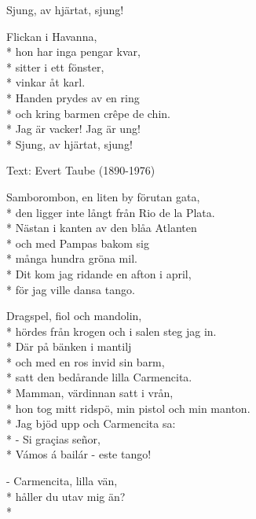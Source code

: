 \begin{SongText}
\begin{SongVerse}
Sjung, av hjärtat, sjung!
\end{SongVerse}
\begin{SongVerse}
Flickan i Havanna,\\*%
hon har inga pengar kvar,\\*%
sitter i ett fönster,\\*%
vinkar åt karl.\\*%
Handen prydes av en ring\\*%
och kring barmen crêpe de chin.\\*%
Jag är vacker! Jag är ung!\\*%
Sjung, av hjärtat, sjung!
\end{SongVerse}
\end{SongText}
\begin{SongText}
\begin{SongInfo}
    Text: Evert Taube (1890-1976)
\end{SongInfo}
\begin{SongVerse}
Samborombon, en liten by förutan gata,\\*%
den ligger inte långt från Rio de la Plata.\\*%
Nästan i kanten av den blåa Atlanten\\*%
och med Pampas bakom sig\\*%
många hundra gröna mil.\\*%
Dit kom jag ridande en afton i april,\\*%
för jag ville dansa tango. 
\end{SongVerse}
\begin{SongVerse}
Dragspel, fiol och mandolin,\\*%
hördes från krogen och i salen steg jag in.\\*%
Där på bänken i mantilj\\*%
och med en ros invid sin barm,\\*%
satt den bedårande lilla Carmencita.\\*%
Mamman, värdinnan satt i vrån,\\*%
hon tog mitt ridspö, min pistol och min 
manton.\\*%
Jag bjöd upp och Carmencita sa:\\*%
- Si graçias señor,\\*%
Vámos á bailár - este tango!
\end{SongVerse}
\begin{SongVerse}
- Carmencita, lilla vän,\\*%
håller du utav mig än?\\*%

\end{SongVerse}
\end{SongText}
